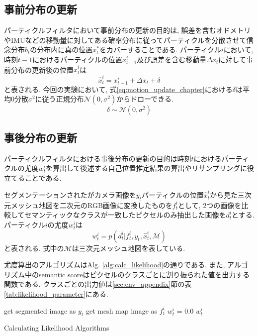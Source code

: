 \subsection{事前分布の更新}\label{sec:motion_update}
パーティクルフィルタにおいて事前分布の更新の目的は, 誤差を含むオドメトリやIMUなどの移動量に対してある確率分布に従ってパーティクルを分散させて信念分布$\hat{b}_{t}$の分布内に真の位置$x_{t}^{*}$をカバーすることである. パーティクル$i$において, 時刻$t-1$におけるパーティクルの位置$x_{t-1}^i$及び誤差を含む移動量$\Delta x_{t}$に対して事前分布の更新後の位置$\hat{x}_{t}^i$は
\begin{equation}\label{eq:motion_update_chapter}
    \hat{x}_{t}^i = x_{t-1}^i + \Delta x_{t} + \delta
\end{equation}
と表される. 今回の実験において, 式\ref{eq:motion_update_chapter}における$\delta$は平均$0$分散$\sigma^{2}$に従う正規分布$\mathcal{N}(0,\sigma^{2})$からドローできる.
\begin{equation}
    \delta \sim \mathcal{N}(0,\sigma^{2})
\end{equation}

\subsection{事後分布の更新}\label{sec:measurement_update}
パーティクルフィルタにおける事後分布の更新の目的は時刻$t$におけるパーティクルの尤度$w^{i}_{t}$を算出して後述する自己位置推定結果の算出やリサンプリングに役立てることである. \par セグメンテーションされたがカメラ画像を$y_{t}$パーティクルの位置$\hat{x}_{t}^{i}$から見た三次元メッシュ地図を二次元のRGB画像に変換したものを$f_{t}^{i}$として, 2つの画像を比較してセマンティックなクラスが一致したピクセルのみ抽出した画像を$d_{t}^{i}$とする. パーティクル$i$の尤度$w_{t}^{i}$は
\begin{equation}\label{eq:particle_likelihood}
    w_{t}^{i} = p(d_{t}^{i}|f_{t}^{i},y_{t},\hat{x}_{t}^{i},\mathcal{M})
\end{equation}
と表される. 式中の$\mathcal{M}$は三次元メッシュ地図を表している. \par 尤度算出のアルゴリズムはAlg. \ref{alg:calc_likelihood}の通りである. また, アルゴリズム中のsemantic scoreはピクセルのクラスごとに割り振られた値を出力する関数である. クラスごとの出力値は\ref{sec:env_appendix}節の表\ref{tab:likelihood_parameter}にある.

\begin{algorithm}[htpb]
 get segmented image as $y_{t}$ \;
 get mesh map image as $f_{t}^{i}$ \;
 $w^{i}_{t}$ = 0.0\;
 \Return $w^{i}_{t}$\;
 
 \caption{Calculating Likelihood Algorithms}
 \label{alg:calc_likelihood}
\end{algorithm}


